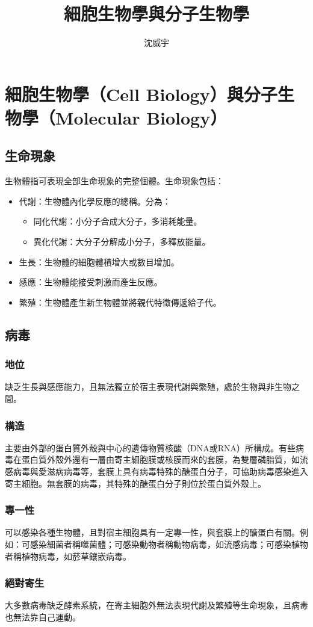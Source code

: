 \documentclass[a4paper,12pt]{report}
\begin{document}
\title{細胞生物學與分子生物學}
\author{沈威宇}
\date{\temtoday}
\titletocdoc
\chapter{細胞生物學（Cell Biology）與分子生物學（Molecular Biology）}
\section{生命現象}
生物體指可表現全部生命現象的完整個體。生命現象包括：
\begin{itemize}
\item 代謝：生物體內化學反應的總稱。分為：
\begin{itemize}
\item 同化代謝：小分子合成大分子，多消耗能量。
\item 異化代謝：大分子分解成小分子，多釋放能量。
\end{itemize}
\item 生長：生物體的細胞體積增大或數目增加。
\item 感應：生物體能接受刺激而產生反應。
\item 繁殖：生物體產生新生物體並將親代特徵傳遞給子代。
\end{itemize}
\section{病毒}
\subsection{地位}
缺乏生長與感應能力，且無法獨立於宿主表現代謝與繁殖，處於生物與非生物之間。
\subsection{構造}
主要由外部的蛋白質外殼與中心的遺傳物質核酸（DNA或RNA）所構成。有些病毒在蛋白質外殼外還有一層由寄主細胞膜或核膜而來的套膜，為雙層磷脂質，如流感病毒與愛滋病病毒等，套膜上具有病毒特殊的醣蛋白分子，可協助病毒感染進入寄主細胞。無套膜的病毒，其特殊的醣蛋白分子則位於蛋白質外殼上。
\subsection{專一性}
可以感染各種生物體，且對宿主細胞具有一定專一性，與套膜上的醣蛋白有關。例如：可感染細菌者稱噬菌體；可感染動物者稱動物病毒，如流感病毒；可感染植物者稱植物病毒，如菸草鑲嵌病毒。
\subsection{絕對寄生}
大多數病毒缺乏酵素系統，在寄主細胞外無法表現代謝及繁殖等生命現象，且病毒也無法靠自己運動。
\end{document}
